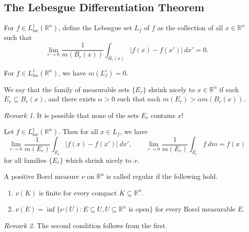 \documentclass[11pt]{article}
\newcommand{\R}{\mathbb{R}}
\newcommand{\Lloc}{L^1_\text{loc}}
\theoremstyle{definition}
\theoremstyle{remark}
\newtheorem*{remark}{Remark}
\begin{document}
    \subsection{The Lebesgue Differentiation Theorem}

    \begin{definition}
        For $f \in \Lloc(\R^n)$, define the Lebesgue set $L_f$ of $f$ as the
        collection of all $x \in \R^n$ such that \[
            \lim_{r \to 0} \frac{1}{m(B_r(x))} \int_{B_r(x)} |f(x) - f(x')| \:dx' = 0.
        \]
    \end{definition}

    \begin{lemma}
        For $f \in \Lloc(\R^n)$, we have $m(L_f^c) = 0$.
    \end{lemma}

    \begin{definition}
        We say that the family of measurable sets $\{E_r\}$ shrink nicely to $x
        \in \R^n$ if each $E_r \subseteq B_r(x)$, and there exists $\alpha > 0$ such
        that each $m(E_r) > \alpha m(B_r(x))$.

        \begin{remark}
            It is possible that none of the sets $E_r$ contains $x$!
        \end{remark}
    \end{definition}

    \begin{theorem}
        Let $f \in \Lloc(\R^n)$. Then for all $x \in L_f$, we have \[
            \lim_{r \to 0} \frac{1}{m(E_r)} \int_{E_r} |f(x) - f(x')|\:dx', \qquad
            \lim_{r \to 0} \frac{1}{m(E_r)} \int_{E_r} f \:dm = f(x)
        \] for all families $\{E_r\}$ which shrink nicely to $x$.
    \end{theorem}


    \begin{definition}
        A positive Borel measure $\nu$ on $\R^n$ is called regular if the following
        hold. \begin{enumerate}
            \item $\nu(K)$ is finite for every compact $K \subseteq \R^n$.
            \item $\nu(E) = \inf\{\nu(U): E \subseteq U, U \subseteq \R^n\text{ is
            open}\}$ for every Borel measurable $E$.
        \end{enumerate}

        \begin{remark}
            The second condition follows from the first.
        \end{remark}
    \end{definition}
\end{document}
